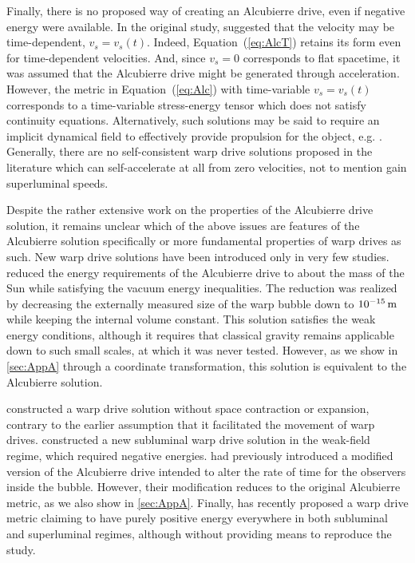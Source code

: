 \documentclass[10pt]{iopart}
\begin{document}
Finally, there is no proposed way of creating an Alcubierre drive, even if negative energy were available. In the original study, \cite{Alcubierre1994} suggested that the velocity may be time-dependent, $v_s = v_s(t)$. Indeed, Equation~(\ref{eq:AlcT}) retains its form even for time-dependent velocities. And, since $v_s=0$ corresponds to flat spacetime, it was assumed that the Alcubierre drive might be generated through acceleration. However, the metric in Equation~(\ref{eq:Alc}) with time-variable $v_s = v_s(t)$ corresponds to a time-variable stress-energy tensor which does not satisfy continuity equations. Alternatively, such solutions may be said to require an implicit dynamical field to effectively provide propulsion for the object, e.g. \cite{Bassett2000}. Generally, there are no self-consistent warp drive solutions proposed in the literature which can self-accelerate at all from zero velocities, not to mention gain superluminal speeds.


Despite the rather extensive work on the properties of the Alcubierre drive solution, it remains unclear which of the above issues are features of the Alcubierre solution specifically or more fundamental properties of warp drives as such. New warp drive solutions have been introduced only in very few studies. \cite{vandenBroeck1999} reduced the energy requirements of the Alcubierre drive to about the mass of the Sun while satisfying the vacuum energy inequalities. The reduction was realized by decreasing the externally measured size of the warp bubble down to $10^{-15}\,{\rm m}$ while keeping the internal volume constant. This solution satisfies the weak energy conditions, although it requires that classical gravity remains applicable down to such small scales, at which it was never tested. However, as we show in \ref{sec:AppA} through a coordinate transformation, this solution is equivalent to the Alcubierre solution.

\cite{Natario2002} constructed a warp drive solution without space contraction or expansion, contrary to the earlier assumption that it facilitated the movement of warp drives. \cite{Natario2006} constructed a new subluminal warp drive solution in the weak-field regime, which required negative energies. \cite{Loup2001} had previously introduced a modified version of the Alcubierre drive intended to alter the rate of time for the observers inside the bubble. However, their modification reduces to the original Alcubierre metric, as we also show in \ref{sec:AppA}. Finally, \cite{Lentz2020} has recently proposed a warp drive metric claiming to have purely positive energy everywhere in both subluminal and superluminal regimes, although without providing means to reproduce the study.
\end{document}
